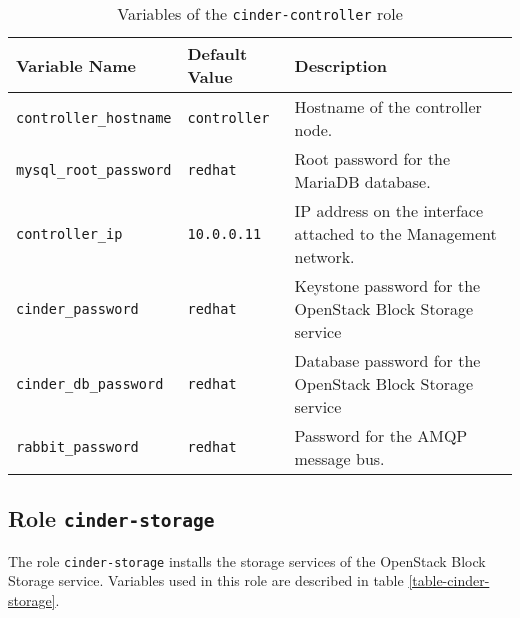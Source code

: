 \begin{table}[!h]
  \centering
  \begin{tabular}{|l|l|p{5cm}|}\hline
    Variable Name & Default Value & Description \\\hline
    \texttt{controller\_hostname} & \texttt{controller} & Hostname of the controller node. \\\hline

    \texttt{mysql\_root\_password} & \texttt{redhat} & Root password for the MariaDB database. \\\hline
    \texttt{controller\_ip} & \texttt{10.0.0.11} & IP address on the interface attached to the Management network. \\\hline

    \texttt{cinder\_password} & \texttt{redhat} & Keystone password for the OpenStack Block Storage service \\\hline
    \texttt{cinder\_db\_password} & \texttt{redhat} & Database password for the OpenStack Block Storage service \\\hline

    \texttt{rabbit\_password} & \texttt{redhat} & Password for the AMQP message bus. \\\hline

  \end{tabular}
\caption{Variables of the \texttt{cinder-controller} role}
\label{table-cinder-controller}
\end{table}

\subsection{Role \texttt{cinder-storage}}

The role \texttt{cinder-storage} installs the storage services of the OpenStack Block Storage service. Variables used in this role are described in table \ref{table-cinder-storage}.

